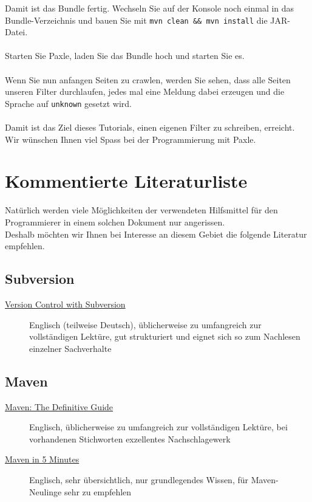 \documentclass[a4paper,12pt]{scrartcl}
\begin{document}
Damit ist das Bundle fertig. Wechseln Sie auf der Konsole noch einmal in das Bundle-Verzeichnis und bauen Sie mit \lstinline[breaklines=false, basicstyle=\itshape]|mvn clean && mvn install| die JAR-Datei.\\
\\
Starten Sie Paxle, laden Sie das Bundle hoch und starten Sie es.\\
\\
Wenn Sie nun anfangen Seiten zu crawlen, werden Sie sehen, dass alle Seiten unseren Filter durchlaufen, jedes mal eine Meldung dabei erzeugen und die Sprache auf \lstinline[breaklines=false, basicstyle=\itshape]|unknown| gesetzt wird.\\
\\
Damit ist das Ziel dieses Tutorials, einen eigenen Filter zu schreiben, erreicht.\\
Wir wünschen Ihnen viel Spass bei der Programmierung mit Paxle.

\newpage
\section{Kommentierte Literaturliste}

Natürlich werden viele Möglichkeiten der verwendeten Hilfsmittel für den Programmierer in einem solchen Dokument nur angerissen.\\
Deshalb möchten wir Ihnen bei Interesse an diesem Gebiet die folgende Literatur empfehlen.
\subsection{Subversion}

\begin{description}
\item[\href{http://svnbook.red-bean.com/nightly/de/svn-book.html}{Version Control with Subversion}] 
Englisch (teilweise Deutsch), üblicherweise zu umfangreich zur vollständigen Lektüre, gut strukturiert und eignet sich so zum Nachlesen einzelner Sachverhalte
\end{description}

\subsection{Maven}
\begin{description}
\item[\href{http://www.sonatype.com/book/reference/public-book.html}{Maven: The Definitive Guide}]
Englisch, üblicherweise zu umfangreich zur vollständigen Lektüre, bei vorhandenen Stichworten exzellentes Nachschlagewerk
\item[\href{http://maven.apache.org/guides/getting-started/maven-in-five-minutes.html}{Maven in 5 Minutes}]
Englisch, sehr übersichtlich, nur grundlegendes Wissen, für Maven-Neulinge sehr zu empfehlen
\end{description}
\end{document}
